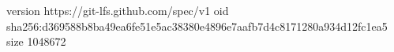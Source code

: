 version https://git-lfs.github.com/spec/v1
oid sha256:d369588b8ba49ea6fe51e5ac38380e4896e7aafb7d4c8171280a934d12fc1ea5
size 1048672
